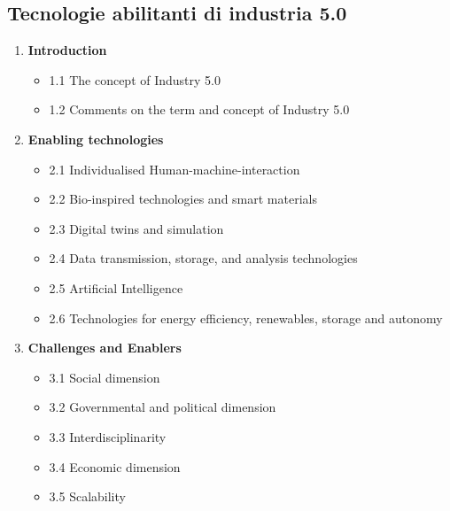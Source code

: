 \documentclass[../main.tex]{subfiles}
\begin{document}
\subsection{Tecnologie abilitanti di industria 5.0}
\begin{enumerate}
    \item \textbf{Introduction}
        \begin{itemize}
            \item 1.1 The concept of Industry 5.0
            \item 1.2 Comments on the term and concept of Industry 5.0
        \end{itemize}
    \item \textbf{Enabling technologies}
        \begin{itemize}
            \item 2.1 Individualised Human-machine-interaction
            \item 2.2 Bio-inspired technologies and smart materials
            \item 2.3 Digital twins and simulation
            \item 2.4 Data transmission, storage, and analysis technologies
            \item 2.5 Artificial Intelligence
            \item 2.6 Technologies for energy efficiency, renewables, storage and autonomy
        \end{itemize}
    \item \textbf{Challenges and Enablers}
        \begin{itemize}
            \item 3.1 Social dimension
            \item 3.2 Governmental and political dimension
            \item 3.3 Interdisciplinarity
            \item 3.4 Economic dimension
            \item 3.5 Scalability
        \end{itemize}
\end{enumerate}
\end{document}
